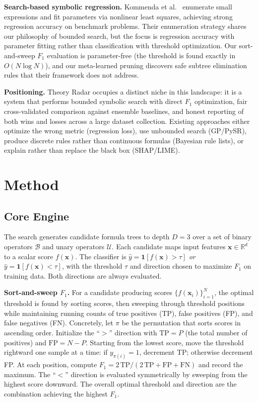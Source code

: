 \documentclass[journal]{IEEEtran}
\begin{document}
\textbf{Search-based symbolic regression.}
Kommenda et al.~\cite{kommenda2020search} enumerate small expressions
and fit parameters via nonlinear least squares, achieving strong
regression accuracy on benchmark problems.  Their enumeration
strategy shares our philosophy of bounded search, but the focus is
regression accuracy with parameter fitting rather than classification
with threshold optimization.  Our sort-and-sweep $F_1$ evaluation is
parameter-free (the threshold is found exactly in $O(N \log N)$),
and our meta-learned pruning discovers safe subtree elimination rules
that their framework does not address.

\textbf{Positioning.}
Theory Radar occupies a distinct niche in this landscape: it is
a system that performs bounded symbolic search
with direct $F_1$ optimization, fair cross-validated comparison
against ensemble baselines, and honest reporting of both wins and
losses across a large dataset collection.  Existing approaches either
optimize the wrong metric (regression loss), use unbounded search
(GP/PySR), produce discrete rules rather than continuous formulas
(Bayesian rule lists), or explain rather than replace the black box
(SHAP/LIME).

\section{Method}
\label{sec:method}

\subsection{Core Engine}
\label{sec:core}

The search generates candidate formula trees to depth $D = 3$ over a
set of binary operators $\mathcal{B}$ and unary operators
$\mathcal{U}$.  Each candidate maps input features
$\mathbf{x} \in \mathbb{R}^d$ to a scalar score $f(\mathbf{x})$.
The classifier is
$\hat{y} = \mathbf{1}[f(\mathbf{x}) > \tau]$ \emph{or}
$\hat{y} = \mathbf{1}[f(\mathbf{x}) < \tau]$, with the threshold
$\tau$ and direction chosen to maximize $F_1$ on training data.
Both directions are always evaluated.

\textbf{Sort-and-sweep $F_1$.}
For a candidate producing scores $\{f(\mathbf{x}_i)\}_{i=1}^N$,
the optimal threshold is found by sorting scores, then sweeping
through threshold positions while maintaining running counts of
true positives (TP), false positives (FP), and false negatives (FN).
Concretely, let $\pi$ be the permutation that sorts scores in
ascending order.  Initialize the ``$>$'' direction with
$\mathrm{TP} = P$ (the total number of positives) and $\mathrm{FP} = N - P$.
Starting from the lowest score, move the threshold rightward one
sample at a time: if $y_{\pi(i)} = 1$, decrement TP; otherwise
decrement FP.  At each position, compute
$F_1 = 2\,\mathrm{TP} / (2\,\mathrm{TP} + \mathrm{FP} + \mathrm{FN})$
and record the maximum.  The ``$<$'' direction is evaluated
symmetrically by sweeping from the highest score downward.  The
overall optimal threshold and direction are the combination
achieving the highest $F_1$.
\end{document}
